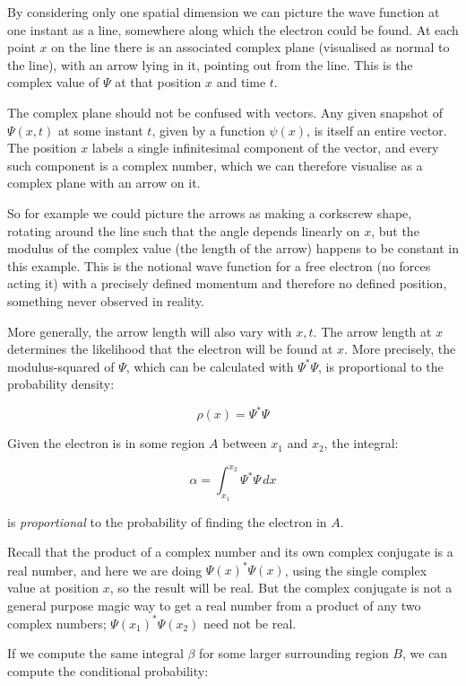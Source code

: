 By considering only one spatial dimension we can picture the wave function at one instant as a line, somewhere along which the electron could be found. At each point $x$ on the line there is an associated complex plane (visualised as normal to the line), with an arrow lying in it, pointing out from the line. This is the complex value of $\Psi$ at that position $x$ and time $t$.

The complex plane should not be confused with vectors. Any given snapshot of $\Psi(x, t)$ at some instant $t$, given by a function $\psi(x)$, is itself an entire vector. The position $x$ labels a single infinitesimal component of the vector, and every such component is a complex number, which we can therefore visualise as a complex plane with an arrow on it.

So for example we could picture the arrows as making a corkscrew shape, rotating around the line such that the angle depends linearly on $x$, but the modulus of the complex value (the length of the arrow) happens to be constant in this example. This is the notional wave function for a free electron (no forces acting it) with a precisely defined momentum and therefore no defined position, something never observed in reality.

More generally, the arrow length will also vary with $x, t$. The arrow length at $x$ determines the likelihood that the electron will be found at $x$. More precisely, the modulus-squared of $\Psi$, which can be calculated with $\Psi^*\Psi$, is proportional to the probability density:

\begin{equation}
  \rho(x) = \Psi^*\Psi
  \label{eqn:pdf}
\end{equation}

Given the electron is in some region $A$ between $x_1$ and $x_2$, the integral:

$$
\alpha =
\int_{x_1}^{x_2}
\Psi^*\Psi
\,dx
$$

is \textit{proportional} to the probability of finding the electron in $A$.

Recall that the product of a complex number and its own complex conjugate is a real number, and here we are doing $\Psi(x)^*\Psi(x)$, using the single complex value at position $x$, so the result will be real. But the complex conjugate is not a general purpose magic way to get a real number from a product of any two complex numbers; $\Psi(x_1)^*\Psi(x_2)$ need not be real.

If we compute the same integral $\beta$ for some larger surrounding region $B$, we can compute the conditional probability:

